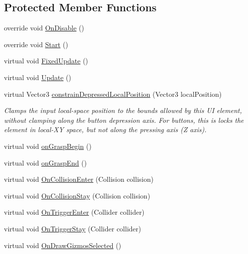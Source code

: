 \subsection*{Protected Member Functions}
\begin{DoxyCompactItemize}
\item 
override void \mbox{\hyperlink{class_leap_1_1_unity_1_1_interaction_1_1_interaction_button_a678babacbcc3d91d865ea76462a30aec}{On\+Disable}} ()
\item 
override void \mbox{\hyperlink{class_leap_1_1_unity_1_1_interaction_1_1_interaction_button_a24a0efb036a0b9ac108e9bf1d5b9fb62}{Start}} ()
\item 
virtual void \mbox{\hyperlink{class_leap_1_1_unity_1_1_interaction_1_1_interaction_button_a6a0addc3c33852bd432f177faf307e9e}{Fixed\+Update}} ()
\item 
virtual void \mbox{\hyperlink{class_leap_1_1_unity_1_1_interaction_1_1_interaction_button_a9bd38d8e028c7e13684ed763e3e2830c}{Update}} ()
\item 
virtual Vector3 \mbox{\hyperlink{class_leap_1_1_unity_1_1_interaction_1_1_interaction_button_a8e073f9ac38439194d9b96de35362eca}{constrain\+Depressed\+Local\+Position}} (Vector3 local\+Position)
\begin{DoxyCompactList}\small\item\em Clamps the input local-\/space position to the bounds allowed by this UI element, without clamping along the button depression axis. For buttons, this is locks the element in local-\/\+XY space, but not along the pressing axis (Z axis). \end{DoxyCompactList}\item 
virtual void \mbox{\hyperlink{class_leap_1_1_unity_1_1_interaction_1_1_interaction_button_a4eaa465478ec3488601a4a8f4a1ef8dd}{on\+Grasp\+Begin}} ()
\item 
virtual void \mbox{\hyperlink{class_leap_1_1_unity_1_1_interaction_1_1_interaction_button_ae4b4b7cc59277eee7fe17fdb6a07652d}{on\+Grasp\+End}} ()
\item 
virtual void \mbox{\hyperlink{class_leap_1_1_unity_1_1_interaction_1_1_interaction_button_ab6a9d171b2ed581ae70aa9844f52fa68}{On\+Collision\+Enter}} (Collision collision)
\item 
virtual void \mbox{\hyperlink{class_leap_1_1_unity_1_1_interaction_1_1_interaction_button_ad24ae3e0c1a3a9feb60ea3046d6a01b6}{On\+Collision\+Stay}} (Collision collision)
\item 
virtual void \mbox{\hyperlink{class_leap_1_1_unity_1_1_interaction_1_1_interaction_button_a088becb31136650ee6b3a83c426d6ed7}{On\+Trigger\+Enter}} (Collider collider)
\item 
virtual void \mbox{\hyperlink{class_leap_1_1_unity_1_1_interaction_1_1_interaction_button_a2a9ae3b082942b0fe99fa88c75e61d0d}{On\+Trigger\+Stay}} (Collider collider)
\item 
virtual void \mbox{\hyperlink{class_leap_1_1_unity_1_1_interaction_1_1_interaction_button_a3cf601cd070b0d92bda43ed675d2f367}{On\+Draw\+Gizmos\+Selected}} ()
\end{DoxyCompactItemize}
